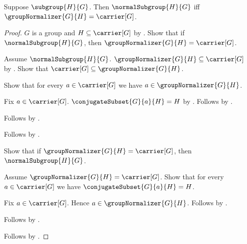 \begin{theorem}\label{normal_subgroup_iff_normalizer_full}
    Suppose $\subgroup{H}{G}$.
    Then $\normalSubgroup{H}{G}$ iff
        $\groupNormalizer{G}{H}=\carrier[G]$.
\end{theorem}
\begin{proof}
    $G$ is a group and $H\subseteq\carrier[G]$ by
        .
    Show that if $\normalSubgroup{H}{G}$, then
        $\groupNormalizer{G}{H}=\carrier[G]$.
    \begin{subproof}
        Assume $\normalSubgroup{H}{G}$.
        $\groupNormalizer{G}{H}\subseteq\carrier[G]$ by
            .
        Show that $\carrier[G]\subseteq\groupNormalizer{G}{H}$.
        \begin{subproof}
            Show that for every $a\in\carrier[G]$ we have
                $a\in\groupNormalizer{G}{H}$.
            \begin{subproof}
                Fix $a\in\carrier[G]$.
                $\conjugateSubset{G}{a}{H}=H$ by
                    .
                Follows by .
            \end{subproof}
            Follows by .
        \end{subproof}
        Follows by .
    \end{subproof}
    Show that if $\groupNormalizer{G}{H}=\carrier[G]$, then
        $\normalSubgroup{H}{G}$.
    \begin{subproof}
        Assume $\groupNormalizer{G}{H}=\carrier[G]$.
        Show that for every $a\in\carrier[G]$ we have
            $\conjugateSubset{G}{a}{H}=H$.
        \begin{subproof}
            Fix $a\in\carrier[G]$.
            Hence $a\in\groupNormalizer{G}{H}$.
            Follows by .
        \end{subproof}
        Follows by .
    \end{subproof}
    Follows by \auto.
\end{proof}
